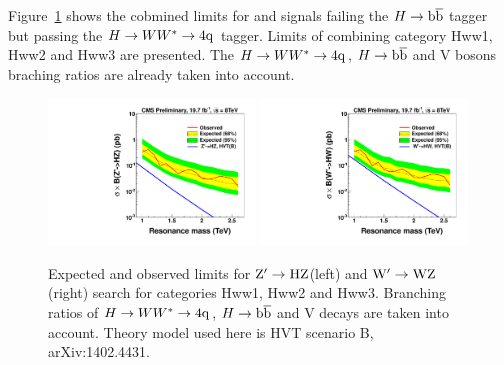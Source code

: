 \fi

Figure~\ref{fig:HwwVCombined} shows the cobmined limits for \HwwVqq and \HbbVqq signals failing the 
$H\to\mathrm{b\overline{b}}$ tagger but passing the             
$H\to WW^*\to4{\rm q}$ tagger. Limits of combining category Hww1, Hww2 and Hww3 are presented.
The $H\to WW^*\to4{\rm q}$, $H\to\mathrm{b\overline{b}}$ and V bosons braching ratios are already taken into account.


\begin{figure}[ht!pb]
\begin{center}
\includegraphics[width=0.49\textwidth]{EXO-14-009/brazilianFlag_HwwZqqHPLPHV.pdf}
\includegraphics[width=0.49\textwidth]{EXO-14-009/brazilianFlag_HwwWqqHPLPHV.pdf}
\end{center}
\caption{Expected and observed limits for ${\rm Z'\to HZ}$(left) and ${\rm W' \to WZ}$(right)
 search for categories Hww1, Hww2 and Hww3. Branching ratios of $H\to WW^*\to4{\rm q}$, $H\to\mathrm{b\overline{b}}$ and V decays are
 taken into account. Theory model used here is HVT scenario B, arXiv:1402.4431.
}
\label{fig:HwwVCombined}
\end{figure}




\clearpage
